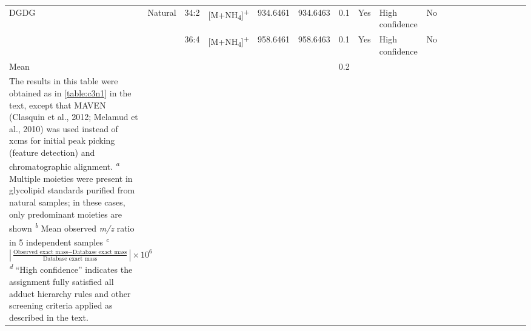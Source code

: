 \begin{landscape}
\begin{footnotesize}
\begin{singlespace}
\begin{longtable}{ Lp{.08\linewidth} Lp{.07\linewidth} Lp{.07\linewidth} Lp{.08\linewidth} Lp{.08\linewidth} Lp{.08\linewidth} Lp{.08\linewidth} Lp{.08\linewidth} Lp{.11\linewidth} Lp{.1\linewidth} }
DGDG & Natural & 34:2 & {[}M+NH\textsubscript{4}{]}\textsuperscript{+} & 934.6461 & 934.6463 & 0.1 & Yes & High confidence & No \\
 &  & 36:4 & {[}M+NH\textsubscript{4}{]}\textsuperscript{+} & 958.6461 & 958.6463 & 0.1 & Yes & High confidence & No \\
Mean &  &  &  &  &  & 0.2 &  &  & \\
\bottomrule
{}
\caption*{The results in this table were obtained as in \autoref{table:c3n1} in the text, except that MAVEN (Clasquin et al., 2012; Melamud et al., 2010) was used instead of xcms for initial peak picking (feature detection) and chromatographic alignment.\\
\emph{\textsuperscript{a}} Multiple moieties were present in glycolipid standards purified from natural samples; in these cases, only predominant moieties are shown\\
\emph{\textsuperscript{b}} Mean observed \emph{m/z} ratio in 5 independent samples\\
\emph{\textsuperscript{c}} $\left| {\frac{{{\text{Observed exact mass}} - {\text{Database exact mass}}}}{{{\text{Database exact mass}}}}} \right| \times {10^6}$\\	
\emph{\textsuperscript{d}} ``High confidence'' indicates the assignment fully satisfied all adduct hierarchy rules and other screening criteria applied as described in the text.
}
\end{longtable}
\end{singlespace}
\end{footnotesize}

\clearpage


\end{landscape}
